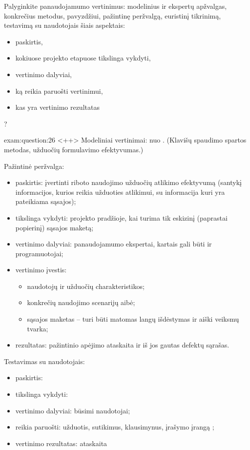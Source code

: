 \begin{question}{%
  Palyginkite panaudojamumo vertinimus: modelinius ir ekspertų apžvalgas,
  konkrečius metodus, pavyzdžiui, pažintinę peržvalgą, euristinį
  tikrinimą, testavimą su naudotojais šiais aspektais:
  \begin{itemize}
    \item paskirtis,
    \item kokiuose projekto etapuose tikslinga vykdyti,
    \item vertinimo dalyviai,
    \item ką reikia paruošti vertinimui,
    \item kas yra vertinimo rezultatas
  \end{itemize}
  ?
  }{exam:question:26}
  <++>
  Modeliniai vertinimai: nuo \cite[42]{skaidres-8}. (Klavišų spaudimo
  spartos metodas, užduočių formulavimo efektyvumas.\cite[68]{skaidres-10})

  Pažintinė peržvalga:
  \begin{itemize}
    \item paskirtis: įvertinti riboto naudojimo užduočių atlikimo
      efektyvumą (santykį informacijos, kurios reikia užduoties
      atlikimui, su informacija kuri yra pateikiama sąsajos);
    \item tikslinga vykdyti: projekto pradžioje, kai turima tik eskizinį
      (paprastai popierinį) sąsajos maketą;
    \item vertinimo dalyviai: panaudojamumo ekspertai, kartais gali būti
      ir programuotojai;
    \item vertinimo įvestis:
      \begin{itemize}
        \item naudotojų ir užduočių charakteristikos;
        \item konkrečių naudojimo scenarijų aibė;
        \item sąsajos maketas – turi būti matomas langų išdėstymas ir
          aiški veiksmų tvarka;
      \end{itemize}
    \item rezultatas: pažintinio apėjimo ataskaita ir iš jos gautas
      defektų sąrašas.
  \end{itemize}

  Testavimas su naudotojais:
  \begin{itemize}
    \item paskirtis:
    \item tikslinga vykdyti:
    \item vertinimo dalyviai: būsimi naudotojai;
    \item reikia paruošti: užduotis, sutikimus, klausimynus, įrašymo
      įrangą \cite[13]{skaidres-10};
    \item vertinimo rezultatas: ataskaita\cite[27--29]{skaidres-10}
  \end{itemize}


\end{question}
